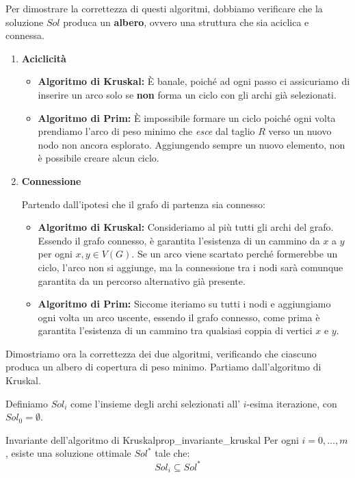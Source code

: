 \documentclass[12pt]{report}
\begin{document}
	Per dimostrare la correttezza di questi algoritmi, dobbiamo verificare che la soluzione $Sol$ produca un \textbf{albero}, ovvero una struttura che sia aciclica e connessa.
	
	\begin{enumerate}
		\item \textbf{Aciclicità}
		\begin{itemize}
			\item \textbf{Algoritmo di Kruskal:} È banale, poiché ad ogni passo ci assicuriamo di inserire un arco solo se \textbf{non} forma un ciclo con gli archi già selezionati.
			
			\item \textbf{Algoritmo di Prim:} È impossibile formare un ciclo poiché ogni volta prendiamo l'arco di peso minimo che \textit{esce} dal taglio $R$ verso un nuovo nodo non ancora esplorato. Aggiungendo sempre un nuovo elemento, non è possibile creare alcun ciclo.
		\end{itemize}
		
		\item \textbf{Connessione}
		
		Partendo dall'ipotesi che il grafo di partenza sia connesso:
		\begin{itemize}
			\item \textbf{Algoritmo di Kruskal:} Consideriamo al più tutti gli archi del grafo. Essendo il grafo connesso, è garantita l'esistenza di un cammino da $x$ a $y$ per ogni $x, y \in V(G)$. Se un arco viene scartato perché formerebbe un ciclo, l'arco non si aggiunge, ma la connessione tra i nodi sarà comunque garantita da un percorso alternativo già presente.
			
			\item \textbf{Algoritmo di Prim:} Siccome iteriamo su tutti i nodi e aggiungiamo ogni volta un arco uscente, essendo il grafo connesso, come prima è garantita l'esistenza di un cammino tra qualsiasi coppia di vertici $x$ e $y$.
		\end{itemize}
	\end{enumerate}
	
	Dimostriamo ora la correttezza dei due algoritmi, verificando che ciascuno produca un albero di copertura di peso minimo. Partiamo dall'algoritmo di Kruskal.
	
	Definiamo $Sol_i$ come l'insieme degli archi selezionati all' $i$-esima iterazione, con $Sol_0 = \emptyset$.
	
	\begin{lemma}{Invariante dell'algoritmo di Kruskal}{prop_invariante_kruskal}
		Per ogni $i = 0, \dots, m$, esiste una soluzione ottimale $Sol^*$ tale che:
		\[
		Sol_i \subseteq Sol^*
		\]
	\end{lemma}
	
\end{document}
